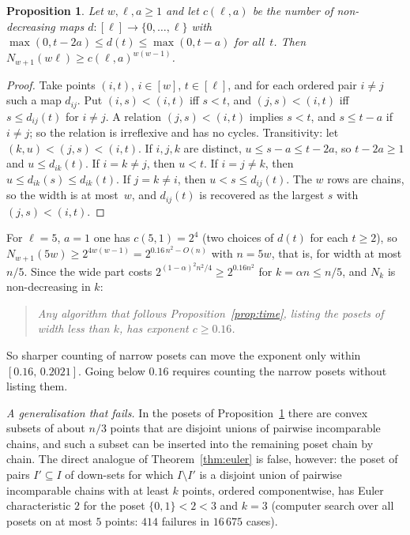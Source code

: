 \documentclass[11pt]{article}
\newtheorem{proposition}[theorem]{Proposition}
\theoremstyle{definition}
\theoremstyle{remark}
\begin{document}
\begin{proposition}\label{prop:band}
Let $w,\ell,a\ge1$ and let $c(\ell,a)$ be the number of non-decreasing maps
$d\colon[\ell]\to\{0,\dots,\ell\}$ with $\max(0,t-2a)\le d(t)\le\max(0,t-a)$ for all~$t$.
Then $N_{w+1}(w\ell)\ge c(\ell,a)^{w(w-1)}$.
\end{proposition}
\begin{proof}
Take points $(i,t)$, $i\in[w]$, $t\in[\ell]$, and for each ordered pair $i\ne j$ such a map
$d_{ij}$. Put $(i,s)<(i,t)$ iff $s<t$, and $(j,s)<(i,t)$ iff $s\le d_{ij}(t)$ for $i\ne j$.
A relation $(j,s)<(i,t)$ implies $s<t$, and $s\le t-a$ if $i\ne j$; so the relation is
irreflexive and has no cycles. Transitivity: let $(k,u)<(j,s)<(i,t)$.
If $i,j,k$ are distinct, $u\le s-a\le t-2a$, so $t-2a\ge1$ and $u\le d_{ik}(t)$.
If $i=k\ne j$, then $u<t$. If $i=j\ne k$, then $u\le d_{ik}(s)\le d_{ik}(t)$.
If $j=k\ne i$, then $u<s\le d_{ij}(t)$. The $w$ rows are chains, so the width is at
most~$w$, and $d_{ij}(t)$ is recovered as the largest $s$ with $(j,s)<(i,t)$.
\end{proof}

For $\ell=5$, $a=1$ one has $c(5,1)=2^4$ (two choices of $d(t)$ for each $t\ge2$), so
$N_{w+1}(5w)\ge 2^{4w(w-1)}=2^{0.16\,n^2-O(n)}$ with $n=5w$, that is, for width at most
$n/5$. Since the wide part costs $2^{(1-\alpha)^2n^2/4}\ge2^{0.16n^2}$ for
$k=\alpha n\le n/5$, and $N_k$ is non-decreasing in $k$:

\begin{quote}
\emph{Any algorithm that follows Proposition~\ref{prop:time}, listing the posets of width
less than $k$, has exponent $c\ge0.16$.}
\end{quote}

So sharper counting of narrow posets can move the exponent only within
$[0.16,\,0.2021]$. Going below $0.16$ requires counting the narrow posets without listing
them.

\medskip\noindent\emph{A generalisation that fails.} In the posets of
Proposition~\ref{prop:band} there are convex subsets of about $n/3$ points that are
disjoint unions of pairwise incomparable chains, and such a subset can be inserted into
the remaining poset chain by chain. The direct analogue of Theorem~\ref{thm:euler} is
false, however: the poset of pairs $I'\subseteq I$ of down-sets for which $I\setminus I'$
is a disjoint union of pairwise incomparable chains with at least $k$ points, ordered
componentwise, has Euler characteristic $2$ for the poset $\{0,1\}<2<3$ and $k=3$
(computer search over all posets on at most $5$ points: $414$ failures in $16\,675$ cases).
\end{document}
